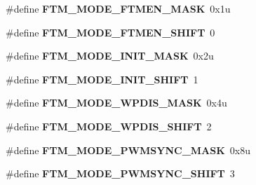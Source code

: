 \begin{DoxyCompactItemize}
\item 
\#define {\bfseries F\+T\+M\+\_\+\+M\+O\+D\+E\+\_\+\+F\+T\+M\+E\+N\+\_\+\+M\+A\+SK}~0x1u\hypertarget{group__FTM__Register__Masks_ga3142bc5c6261a7c04c95844ef35edd5b}{}\label{group__FTM__Register__Masks_ga3142bc5c6261a7c04c95844ef35edd5b}

\item 
\#define {\bfseries F\+T\+M\+\_\+\+M\+O\+D\+E\+\_\+\+F\+T\+M\+E\+N\+\_\+\+S\+H\+I\+FT}~0\hypertarget{group__FTM__Register__Masks_ga38df569e214287fa43254c2ddeafa5b5}{}\label{group__FTM__Register__Masks_ga38df569e214287fa43254c2ddeafa5b5}

\item 
\#define {\bfseries F\+T\+M\+\_\+\+M\+O\+D\+E\+\_\+\+I\+N\+I\+T\+\_\+\+M\+A\+SK}~0x2u\hypertarget{group__FTM__Register__Masks_ga069f8d36fce3b99bf22cf8e588b855bf}{}\label{group__FTM__Register__Masks_ga069f8d36fce3b99bf22cf8e588b855bf}

\item 
\#define {\bfseries F\+T\+M\+\_\+\+M\+O\+D\+E\+\_\+\+I\+N\+I\+T\+\_\+\+S\+H\+I\+FT}~1\hypertarget{group__FTM__Register__Masks_ga0d0d007a2359f31a0cf50b06acef810c}{}\label{group__FTM__Register__Masks_ga0d0d007a2359f31a0cf50b06acef810c}

\item 
\#define {\bfseries F\+T\+M\+\_\+\+M\+O\+D\+E\+\_\+\+W\+P\+D\+I\+S\+\_\+\+M\+A\+SK}~0x4u\hypertarget{group__FTM__Register__Masks_ga1178ceaccafa6eb9f10395901c75f7ba}{}\label{group__FTM__Register__Masks_ga1178ceaccafa6eb9f10395901c75f7ba}

\item 
\#define {\bfseries F\+T\+M\+\_\+\+M\+O\+D\+E\+\_\+\+W\+P\+D\+I\+S\+\_\+\+S\+H\+I\+FT}~2\hypertarget{group__FTM__Register__Masks_ga36fb0f391d4b52f38caf711ba8d73ae7}{}\label{group__FTM__Register__Masks_ga36fb0f391d4b52f38caf711ba8d73ae7}

\item 
\#define {\bfseries F\+T\+M\+\_\+\+M\+O\+D\+E\+\_\+\+P\+W\+M\+S\+Y\+N\+C\+\_\+\+M\+A\+SK}~0x8u\hypertarget{group__FTM__Register__Masks_ga3993337287da1b6624d5f7d70f10b3d5}{}\label{group__FTM__Register__Masks_ga3993337287da1b6624d5f7d70f10b3d5}

\item 
\#define {\bfseries F\+T\+M\+\_\+\+M\+O\+D\+E\+\_\+\+P\+W\+M\+S\+Y\+N\+C\+\_\+\+S\+H\+I\+FT}~3\hypertarget{group__FTM__Register__Masks_ga5e9f1c44632b559046173b3b0db93170}{}\label{group__FTM__Register__Masks_ga5e9f1c44632b559046173b3b0db93170}


\end{DoxyCompactItemize}
